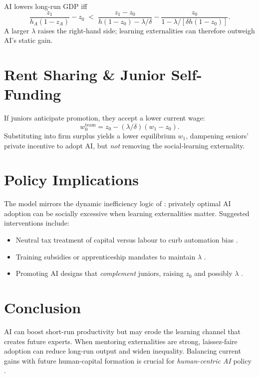 \documentclass[12pt]{article}
\begin{document}
AI lowers long-run GDP iff
\[
\frac{z_{1}}{h_{A}(1-z_{A})} - z_{0}  
  \;<\;
\frac{z_{1}-z_{0}}{h(1-z_{0})-\lambda/\delta}
  - 
\frac{z_{0}}{1-\lambda/[\delta h(1-z_{0})]}.
\]
A larger $\lambda$ raises the right-hand side; learning externalities can therefore outweigh AI’s static gain.

\section{Rent Sharing \& Junior Self-Funding}

If juniors anticipate promotion, they accept a lower current wage:
\[
w_{0}^{\text{team}} = z_{0} - (\lambda/\delta)(w_{1}-z_{0}).
\]
Substituting into firm surplus yields a lower equilibrium $w_{1}$, dampening seniors’ private incentive to adopt AI, but \emph{not} removing the social‐learning externality.

\section{Policy Implications}

The model mirrors the dynamic inefficiency logic of \citet{BueraBeraja2025}: privately optimal AI adoption can be socially excessive when learning externalities matter.  Suggested interventions include:
\begin{itemize}
    \item Neutral tax treatment of capital versus labour to curb automation bias \citep{AcemogluEtAl2023}.
    \item Training subsidies or apprenticeship mandates to maintain $\lambda$ \citep{Muehlemann2024}.
    \item Promoting AI designs that \emph{complement} juniors, raising $z_{0}$ and possibly $\lambda$ \citep{BrynjolfssonLiRaymond2023}.
\end{itemize}

\section{Conclusion}

AI can boost short-run productivity but may erode the learning channel that creates future experts.  When mentoring externalities are strong, laissez-faire adoption can reduce long-run output and widen inequality.  Balancing current gains with future human-capital formation is crucial for \emph{human-centric AI} policy \citep{AcemogluEtAl2023}.
\end{document}

